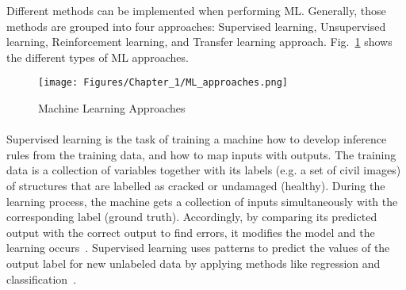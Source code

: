 Different methods can be implemented when performing ML. 
Generally, those methods are grouped into four approaches: Supervised learning, Unsupervised learning, Reinforc\-ement learning, and Transfer learning approach.
Fig.~\ref{fig:Machine_learning_approaches} shows the different types of ML approaches.
\begin{figure} [!ht]
	\begin{center}
		\centering
		\texttt{[image: Figures/Chapter\_1/ML\_approaches.png]}
	\end{center}
	\caption{Machine Learning Approaches} 
	\label{fig:Machine_learning_approaches}
\end{figure}
\paragraph{}
Supervised learning is the task of training a machine how to develop inference rules from the training data, and how to map inputs with outputs.
The training data is a collection of variables together with its labels (e.g. a set of civil images) of structures that are labelled as cracked or undamaged (healthy).
During the learning process, the machine gets a collection of inputs simultaneously with the corresponding label (ground truth).
Accordingly, by comparing its predicted output with the correct output to find errors, it modifies the model and the learning occurs~\cite{Ongsulee2018}. 
Supervised learning uses patterns to predict the values of the output label for new unlabeled data by applying methods like regression and classification~\cite{Ongsulee2018}. 

